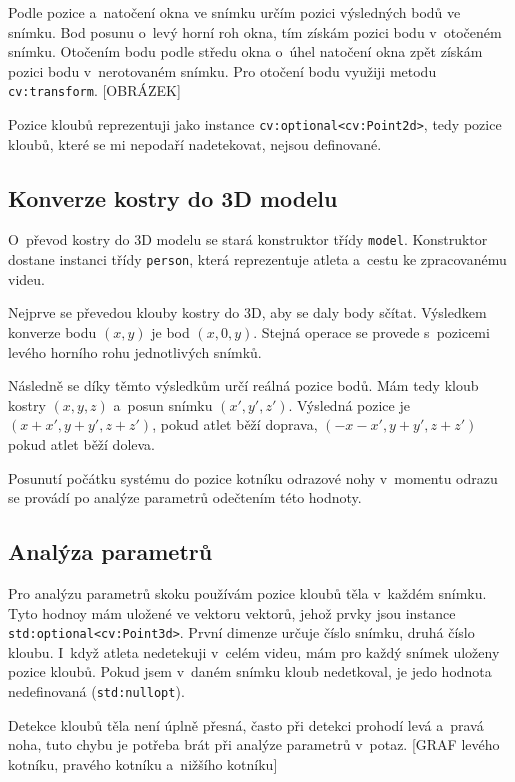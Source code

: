 Podle pozice a~natočení okna ve snímku určím pozici výsledných bodů ve snímku. Bod posunu o~levý horní roh okna, tím získám pozici bodu v~otočeném snímku. Otočením bodu podle středu okna o~úhel natočení okna zpět získám pozici bodu v~nerotovaném snímku. Pro otočení bodu využiji metodu \texttt{cv\::transform}. [OBRÁZEK]

Pozice kloubů reprezentuji jako instance \texttt{cv\::optional<cv\::Point2d>}, tedy pozice kloubů, které se mi nepodaří nadetekovat, nejsou definované.



\subsection{Konverze kostry do 3D modelu}

O~převod kostry do 3D modelu se stará konstruktor třídy \texttt{model}. Konstruktor dostane instanci třídy \texttt{person}, která reprezentuje atleta a~cestu ke zpracovanému videu.

Nejprve se převedou klouby kostry do 3D, aby se daly body sčítat. Výsledkem konverze bodu $(x,y)$ je bod $(x,0,y)$. Stejná operace se provede s~pozicemi levého horního rohu jednotlivých snímků.

Následně se díky těmto výsledkům určí reálná pozice bodů. Mám tedy kloub kostry $(x,y,z)$ a~posun snímku $(x',y',z')$. Výsledná pozice je $(x+x',y+y',z+z')$, pokud atlet běží doprava, $(-x-x',y+y',z+z')$ pokud atlet běží doleva.

Posunutí počátku systému do pozice kotníku odrazové nohy v~momentu odrazu se provádí po analýze parametrů odečtením této hodnoty.



\subsection{Analýza parametrů}

Pro analýzu parametrů skoku používám pozice kloubů těla v~každém snímku. Tyto hodnoy mám uložené ve vektoru vektorů, jehož prvky jsou instance \texttt{std\::optional<cv\::Point3d>}. První dimenze určuje číslo snímku, druhá číslo kloubu. I~když atleta nedetekuji v~celém videu, mám pro každý snímek uloženy pozice kloubů. Pokud jsem v~daném snímku kloub nedetkoval, je jedo hodnota nedefinovaná (\texttt{std\::nullopt}).

Detekce kloubů těla není úplně přesná, často při detekci prohodí levá a~pravá noha, tuto chybu je potřeba brát při analýze parametrů v~potaz. [GRAF levého kotníku, pravého kotníku a~nižšího kotníku]

